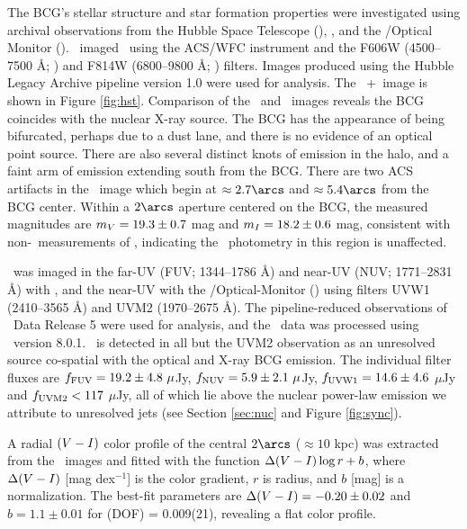 \documentclass[11pt, preprint]{aastex}
\begin{document}
The BCG's stellar structure and star formation properties were
investigated using archival observations from the Hubble Space
Telescope (\hst), \galex, and the \xmm/Optical Monitor
(\xom). \hst\ imaged \rbs\ using the ACS/WFC instrument and the F606W
(4500--7500 \AA; \myv) and F814W (6800--9800 \AA; \myi)
filters. Images produced using the Hubble Legacy Archive pipeline
version 1.0 were used for analysis. The \hst\ \myv+\myi\ image is
shown in Figure \ref{fig:hst}. Comparison of the \hst\ and
\cxo\ images reveals the BCG coincides with the nuclear X-ray
source. The BCG has the appearance of being bifurcated, perhaps due to
a dust lane, and there is no evidence of an optical point
source. There are also several distinct knots of emission in the halo,
and a faint arm of emission extending south from the BCG. There are
two ACS artifacts in the \myi\ image which begin at $\approx 2.7\arcs$
and $\approx 5.4\arcs$ from the BCG center. Within a $2\arcs$ aperture
centered on the BCG, the measured magnitudes are $m_{V} = 19.3 \pm
0.7$ mag and $m_{I} = 18.2 \pm 0.6$ mag, consistent with
non-\hst\ measurements of \citet{rbs1}, indicating the
\hst\ photometry in this region is unaffected.

\rbs\ was imaged in the far-UV (FUV; 1344--1786 \AA) and near-UV (NUV;
1771--2831 \AA) with \galex, and the near-UV with the
\xmm/Optical-Monitor (\xom) using filters UVW1 (2410--3565 \AA) and
UVM2 (1970--2675 \AA). The pipeline-reduced observations of
\galex\ Data Release 5 were used for analysis, and the \xom\ data was
processed using \sas\ version 8.0.1. \rbs\ is detected in all but the
UVM2 observation as an unresolved source co-spatial with the optical
and X-ray BCG emission. The individual filter fluxes are $f_{\rm{FUV}}
= 19.2 \pm 4.8 ~\mu$Jy, $f_{\rm{NUV}} = 5.9 \pm 2.1 ~\mu$Jy,
$f_{\rm{UVW1}} = 14.6 \pm 4.6$ $\mu$Jy and $f_{\rm{UVM2}} < 117$
$\mu$Jy, all of which lie above the nuclear power-law emission we
attribute to unresolved jets (see Section \ref{sec:nuc} and Figure
\ref{fig:sync}).

A radial $(V-I)$ color profile of the central $2\arcs$ ($\approx
10$ kpc) was extracted from the \hst\ images and fitted with the
function $\Delta(V-I) \log r + b$, where $\Delta(V-I)$
[mag dex$^{-1}$] is the color gradient, $r$ is radius, and $b$ [mag]
is a normalization. The best-fit parameters are $\Delta(V-I) =
-0.20 \pm 0.02$ and $b = 1.1 \pm 0.01$ for \chisq(DOF) = 0.009(21),
revealing a flat color profile.
\end{document}
